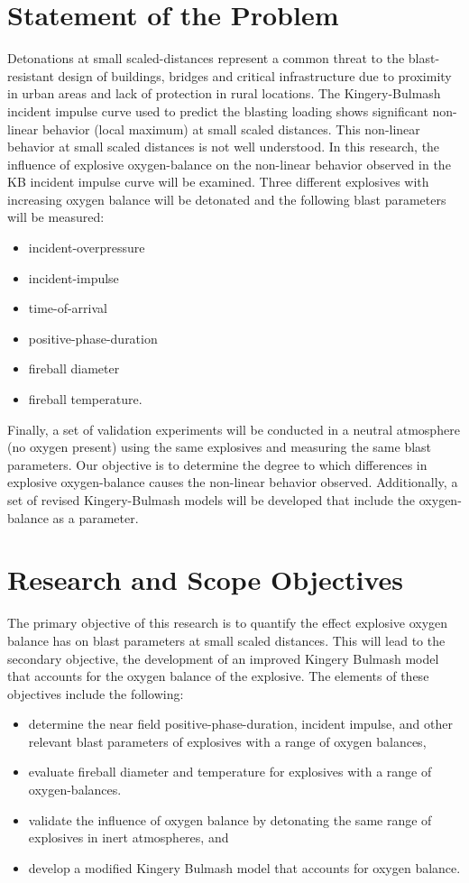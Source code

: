 \section{Statement of the Problem}
Detonations at small scaled-distances represent a common threat to the blast-resistant design of buildings, bridges and critical infrastructure due to proximity in urban areas and lack of protection in rural locations. The Kingery-Bulmash incident impulse curve used to predict the blasting loading shows significant non-linear behavior (local maximum) at small scaled distances.  This non-linear behavior at small scaled distances is not well understood.
In this research, the influence of explosive oxygen-balance on the non-linear behavior observed in the KB incident impulse curve will be examined. Three different explosives with increasing oxygen balance will be detonated and the following blast parameters will be measured:
\begin{itemize}
	\item incident-overpressure
	\item incident-impulse
	\item time-of-arrival
	\item positive-phase-duration
	\item fireball diameter
	\item fireball temperature.
\end{itemize}
Finally, a set of validation experiments will be conducted in a neutral atmosphere (no oxygen present) using the same explosives and measuring the same blast parameters. Our objective is to determine the degree to which differences in explosive oxygen-balance causes the non-linear behavior observed.  Additionally, a set of revised Kingery-Bulmash models will be developed that include the oxygen-balance as a parameter.

\section{Research and Scope Objectives}
The primary objective of this research is to quantify the effect explosive oxygen balance has on blast parameters at small scaled distances. This will lead to the secondary objective, the development of an improved Kingery Bulmash model that accounts for the oxygen balance of the explosive. The elements of these objectives include the following: 
\begin{itemize}
    \item determine the near field positive-phase-duration, incident impulse, and other relevant blast parameters of explosives with a range of oxygen balances,
    \item evaluate fireball diameter and temperature for explosives with a range of oxygen-balances.
    \item validate the influence of oxygen balance by detonating the same range of explosives in inert atmospheres, and
    \item develop a modified Kingery Bulmash model that accounts for oxygen balance.
\end{itemize}
 
